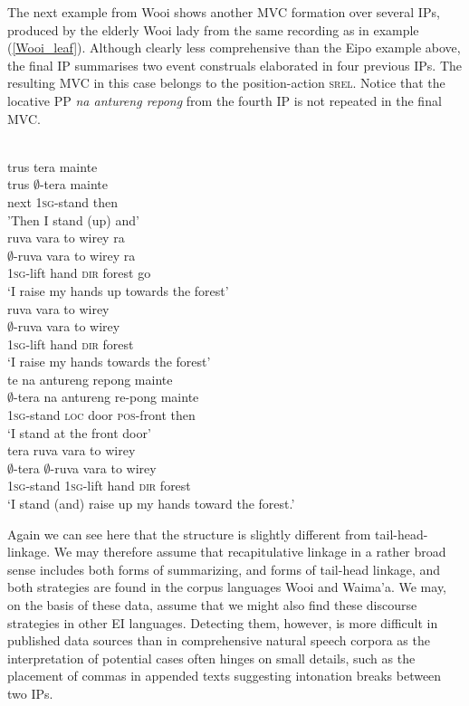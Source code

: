 The next example from Wooi shows another MVC formation over several IPs, produced by the elderly Wooi lady from the same recording as in example (\ref{Wooi_leaf}). Although clearly less comprehensive than the Eipo example above, the final IP summarises two event construals elaborated in four previous IPs. The resulting MVC in this case belongs to the position-action \textsc{srel}. Notice that the locative PP \textit{na antureng repong} from the fourth IP is not repeated in the final MVC.

\ea \label{}
\\
\ea
\glll trus tera mainte \\
trus $\emptyset$-tera mainte \\
next \textsc{1}\textsc{sg}-stand then \\
\glft 'Then I stand (up) and'\\ 
\ex
\glll ruva vara to wirey ra \\
$\emptyset$-ruva vara to wirey ra \\
\textsc{1}\textsc{sg}-lift hand \textsc{dir} forest go \\
\glft `I raise my hands up towards the forest'\\ 
\ex
\glll ruva vara to wirey \\
$\emptyset$-ruva vara to wirey \\
\textsc{1}\textsc{sg}-lift hand \textsc{dir} forest \\
\glft `I raise my hands towards the forest'\\ 
\ex
\glll te na antureng repong mainte \\
$\emptyset$-tera na antureng re-pong mainte \\
\textsc{1}\textsc{sg}-stand \textsc{loc} door \textsc{pos}-front then \\
\glft `I stand at the front door'\\ 
\ex
\glll tera ruva vara to wirey \\
$\emptyset$-tera $\emptyset$-ruva vara to wirey \\
\textsc{1}\textsc{sg}-stand \textsc{1}\textsc{sg}-lift hand \textsc{dir} forest \\
\glft `I stand (and) raise up my hands toward the forest.'\\ 
\z
\z

Again we can see here that the structure is slightly different from tail-head-linkage. We may therefore assume that recapitulative linkage in a rather broad sense includes both forms of summarizing, and forms of tail-head linkage, and both strategies are found in the corpus languages Wooi and Waima'a. We may, on the basis of these data, assume that we might also find these discourse strategies in other EI languages. Detecting them, however, is more difficult in published data sources than in comprehensive natural speech corpora as the interpretation of potential cases often hinges on small details, such as the placement of commas in appended texts suggesting intonation breaks between two IPs.

